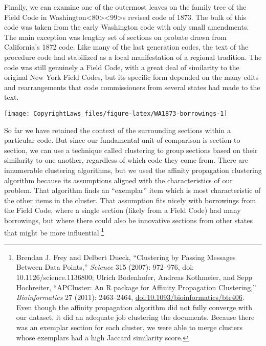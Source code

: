 \documentclass[12pt,]{article}
\let\rmarkdownfootnote\footnote%
\def\footnote{\protect\rmarkdownfootnote}
\begin{document}
Finally, we can examine one of the outermost leaves on the family tree
of the Field Code in
Washington\textless80\textgreater\textless99\textgreater s revised code
of 1873. The bulk of this code was taken from the early Washington code
with only small amendments. The main exception was lengthy set of
sections on probate drawn from California's 1872 code. Like many of the
last generation codes, the text of the procedure code had stabilized as
a local manifestation of a regional tradition. The code was still
genuinely a Field Code, with a great deal of similarity to the original
New York Field Codes, but its specific form depended on the many edits
and rearrangements that code commissioners from several states had made
to the text.

\begin{center}\texttt{[image: CopyrightLaws\_files/figure-latex/WA1873-borrowings-1]} \end{center}

So far we have retained the context of the surrounding sections within a
particular code. But since our fundamental unit of comparison is section
to section, we can use a technique called clustering to group sections
based on their similarity to one another, regardless of which code they
come from. There are innumerable clustering algorithms, but we used the
affinity propagation clustering algorithm because its assumptions
aligned with the characteristics of our problem. That algorithm finds an
``exemplar'' item which is most characteristic of the other items in the
cluster. That assumption fits nicely with borrowings from the Field
Code, where a single section (likely from a Field Code) had many
borrowings, but where there could also be innovative sections from other
states that might be more influential.\footnote{Brendan J. Frey and
  Delbert Dueck, ``Clustering by Passing Messages Between Data Points,''
  \emph{Science} 315 (2007): 972--976, doi: 10.1126/science.1136800;
  Ulrich Bodenhofer, Andreas Kothmeier, and Sepp Hochreiter,
  ``APCluster: An R package for Affinity Propagation Clustering,''
  \emph{Bioinformatics} 27 (2011): 2463--2464,
  \url{doi:10.1093/bioinformatics/btr406}. Even though the affinity
  propagation algorithm did not fully converge with our dataset, it did
  an adequate job clustering the documents. Because there was an
  exemplar section for each cluster, we were able to merge clusters
  whose exemplars had a high Jaccard similarity score.}
\end{document}
